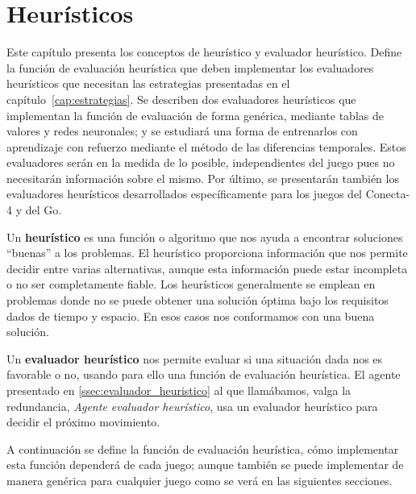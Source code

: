 \chapter{Heurísticos}
\label{cap:heuristicos}
Este capítulo presenta los conceptos de heurístico y evaluador heurístico.
Define la función de evaluación heurística que deben implementar los evaluadores heurísticos que necesitan las estrategias presentadas en el capítulo~\ref{cap:estrategias}.
Se describen dos evaluadores heurísticos que implementan la función de evaluación de forma genérica, mediante tablas de valores y redes neuronales; y se estudiará una forma de entrenarlos con aprendizaje con refuerzo mediante el método de las diferencias temporales.
Estos evaluadores serán en la medida de lo posible, independientes del juego pues no necesitarán información sobre el mismo.
Por último, se presentarán también los evaluadores heurísticos desarrollados específicamente para los juegos del Conecta-4 y del Go.

\bigskip
Un \textbf{heurístico} es una función o algoritmo que nos ayuda a encontrar soluciones ``buenas'' a los problemas.
El heurístico proporciona información que nos permite decidir entre varias alternativas, aunque esta información puede estar incompleta o no ser completamente fiable.
Los heurísticos generalmente se emplean en problemas donde no se puede obtener una solución óptima bajo los requisitos dados de tiempo y espacio. En esos casos nos conformamos con una buena solución.


Un \textbf{evaluador heurístico} nos permite evaluar si una situación dada nos es favorable o no, usando para ello una función de evaluación heurística.
El agente presentado en \ref{ssec:evaluador_heuristico} al que llamábamos, valga la redundancia, \textit{Agente evaluador heurístico}, usa un evaluador heurístico para decidir el próximo movimiento.

\bigskip
A continuación se define la función de evaluación heurística, cómo implementar esta función dependerá de cada juego; aunque también se puede implementar de manera genérica para cualquier juego como se verá en las siguientes secciones.

